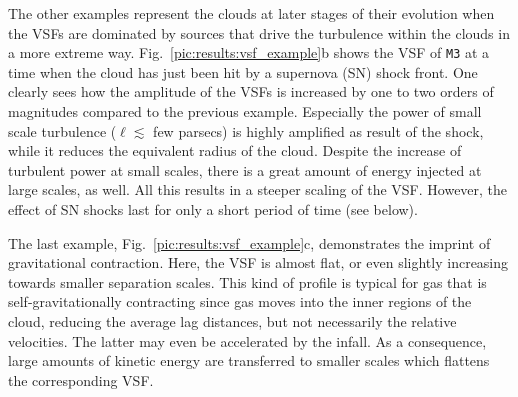 The other examples represent the clouds at later stages of their evolution when the VSFs are dominated by sources that drive the turbulence within the clouds in a more extreme way.
Fig.~\ref{pic:results:vsf_example}b shows the VSF of \texttt{M3} at a time when the cloud has just been hit by a supernova (SN) shock front. 
One clearly sees how the amplitude of the VSFs is increased by one to two orders of magnitudes compared to the previous example.
Especially the power of small scale turbulence ($\ell \lesssim$ few parsecs) is highly amplified as result of the shock, while it reduces the equivalent radius of the cloud.
Despite the increase of turbulent power at small scales, there is a great amount of energy injected at large scales, as well.
All this results in a steeper scaling of the VSF.
However, the effect of SN shocks last for only a short period of time (see below).

The last example, Fig.~\ref{pic:results:vsf_example}c, demonstrates the imprint of gravitational contraction.
Here, the VSF is almost flat, or even slightly increasing towards smaller separation scales. 
This kind of profile is typical for gas that is self-gravitationally contracting \citep{Boneberg2015,Burkhart2015} since gas moves into the inner regions of the cloud, reducing the average lag distances, but not necessarily the relative velocities.
The latter may even be accelerated by the infall.
As a consequence, large amounts of kinetic energy are transferred to smaller scales which flattens the corresponding VSF.


\endinput
